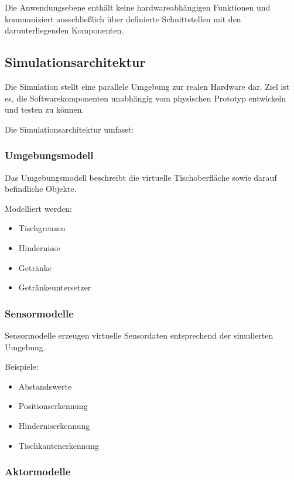 \documentclass[
  a4paper,
  12pt,
  DIV=12,        %
  parskip=half,  %
  headings=small %
]{scrartcl}
\theoremstyle{definition}
\providecommand{\tightlist}{%
  \setlength{\itemsep}{0pt}\setlength{\parskip}{0pt}}
\theoremstyle{definition}
\begin{document}
Die Anwendungsebene enthält keine hardwareabhängigen Funktionen und
kommuniziert ausschließlich über definierte Schnittstellen mit den
darunterliegenden Komponenten.

\subsection{Simulationsarchitektur}\label{simulationsarchitektur}

Die Simulation stellt eine parallele Umgebung zur realen Hardware dar.
Ziel ist es, die Softwarekomponenten unabhängig vom physischen Prototyp
entwickeln und testen zu können.

Die Simulationsarchitektur umfasst:

\subsubsection{Umgebungsmodell}\label{umgebungsmodell}

Das Umgebungsmodell beschreibt die virtuelle Tischoberfläche sowie
darauf befindliche Objekte.

Modelliert werden:

\begin{itemize}
\tightlist
\item
  Tischgrenzen
\item
  Hindernisse
\item
  Getränke
\item
  Getränkeuntersetzer
\end{itemize}

\subsubsection{Sensormodelle}\label{sensormodelle}

Sensormodelle erzeugen virtuelle Sensordaten entsprechend der
simulierten Umgebung.

Beispiele:

\begin{itemize}
\tightlist
\item
  Abstandswerte
\item
  Positionserkennung
\item
  Hinderniserkennung
\item
  Tischkantenerkennung
\end{itemize}

\subsubsection{Aktormodelle}\label{aktormodelle}
\end{document}
